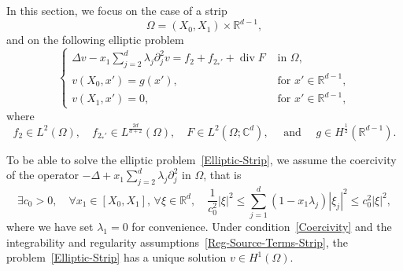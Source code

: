 \documentclass[10pt]{amsart}
\theoremstyle{definition}\newtheorem{defi}[theo]{Definition}\newtheorem{rema}[theo]{Remark}\newtheorem{exam}[theo]{Example}\newtheorem{exem}[theo]{Example}\newtheorem{nota}[theo]{Notation}
\newcommand*\R{\mathbb{R}}
\newcommand*\C{\mathbb{C}}
\renewcommand{\leq}{\leqslant}
\renewcommand{\div}{\operatorname{div}}
\let\oldexists\exists
\renewcommand*{\exists}{\mathrel{\oldexists}}
\let\oldforall\forall
\renewcommand*{\forall}{\mathrel{\oldforall}}
\begin{document}
In this section, we focus on the case of a strip
\begin{equation}\label{Omega=Strip}
\Omega = (X_0,X_1) \times \R^{d-1},
\end{equation}
and on the following elliptic problem
\begin{equation}\label{Elliptic-Strip}
\left\{
\begin{array}{ll}
\Delta v-x_{1} \sum\limits_{j=2}^{d} \lambda_{j} \partial_{j}^{2} v = f_2 + f_{2_*'} + \div F & \text { in } \Omega,
\\
v\left(X_{0}, x'\right)=g (x'), &\text{ for } x' \in \R^{d-1},
\\
v\left(X_{1}, x'\right)= 0, &\text{ for } x' \in \R^{d-1},
\end{array}
\right.
\end{equation}
where
\begin{equation}\label{Reg-Source-Terms-Strip}
f_2 \in L^2(\Omega),
\quad f_{2_*'} \in L^{\frac{2d}{d+2}}(\Omega),
\quad F \in L^2\left(\Omega; \C^{d}\right),
\quad\text{ and } \quad g \in H^{\frac{1}{2}}\left(\R^{d-1}\right).
\end{equation}

To be able to solve the elliptic problem~\eqref{Elliptic-Strip}, we assume the coercivity of the operator $-\Delta + x_1 \sum_{j=2}^d \lambda_j \partial_j^2$ in $\Omega$, that is
\begin{equation}\label{Coercivity}
\exists c_0 >0, \quad \forall x_1 \in [X_0, X_1],\, \forall \xi \in \R^{d}, \quad
\frac{1}{c_0^2} |\xi|^2 \leq \sum_{j =1}^d \left(1 - x_1 \lambda_j\right) |\xi_j|^2 \leq c_0^2 |\xi|^2,
\end{equation}
where we have set $\lambda_1 = 0$ for convenience. Under condition~\eqref{Coercivity} and the integrability and regularity assumptions~\eqref{Reg-Source-Terms-Strip}, the problem~\eqref{Elliptic-Strip} has a unique solution $v \in H^1(\Omega)$.
\end{document}
